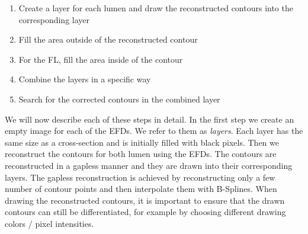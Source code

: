 \documentclass[thesis.tex]{subfiles}
\begin{document}
\begin{enumerate}
\item Create a layer for each lumen and draw the reconstructed contours into the corresponding layer
\item Fill the area outside of the reconstructed contour
\item For the FL, fill the area inside of the contour
\item Combine the layers in a specific way
\item Search for the corrected contours in the combined layer
\end{enumerate}

We will now describe each of these steps in detail. In the first step we create an empty image for each of the EFDs. We refer to them as \textit{layers}. Each layer has the same size as a cross-section and is initially filled with black pixels. Then we reconstruct the contours for both lumen using the EFDs. The contours are reconstructed in a gapless manner and they are drawn into their corresponding layers. The gapless reconstruction is achieved by reconstructing only a few number of contour points and then interpolate them with B-Splines. When drawing the reconstructed contours, it is important to ensure that the drawn contours can still be differentiated, for example by choosing different drawing colors / pixel intensities. 
\end{document}
